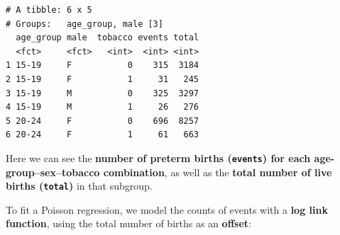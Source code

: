 \documentclass[
  letterpaper,
  DIV=11,
  numbers=noendperiod]{scrreprt}
\newenvironment{Shaded}{\begin{snugshade}}{\end{snugshade}}
\newcommand{\AttributeTok}[1]{\textcolor[rgb]{0.40,0.45,0.13}{#1}}
\newcommand{\ConstantTok}[1]{\textcolor[rgb]{0.56,0.35,0.01}{#1}}
\newcommand{\DecValTok}[1]{\textcolor[rgb]{0.68,0.00,0.00}{#1}}
\newcommand{\FunctionTok}[1]{\textcolor[rgb]{0.28,0.35,0.67}{#1}}
\newcommand{\NormalTok}[1]{\textcolor[rgb]{0.00,0.23,0.31}{#1}}
\newcommand{\OtherTok}[1]{\textcolor[rgb]{0.00,0.23,0.31}{#1}}
\newcommand{\SpecialCharTok}[1]{\textcolor[rgb]{0.37,0.37,0.37}{#1}}
\newcommand{\StringTok}[1]{\textcolor[rgb]{0.13,0.47,0.30}{#1}}
\begin{document}
\begin{Shaded}
\end{Shaded}

\begin{verbatim}
# A tibble: 6 x 5
# Groups:   age_group, male [3]
  age_group male  tobacco events total
  <fct>     <fct>   <int>  <int> <int>
1 15-19     F           0    315  3184
2 15-19     F           1     31   245
3 15-19     M           0    325  3297
4 15-19     M           1     26   276
5 20-24     F           0    696  8257
6 20-24     F           1     61   663
\end{verbatim}

Here we can see the \textbf{number of preterm births (\texttt{events})
for each age-group--sex--tobacco combination}, as well as the
\textbf{total number of live births (\texttt{total})} in that subgroup.

To fit a Poisson regression, we model the counts of events with a
\textbf{log link function}, using the total number of births as an
\textbf{offset}:
\end{document}

